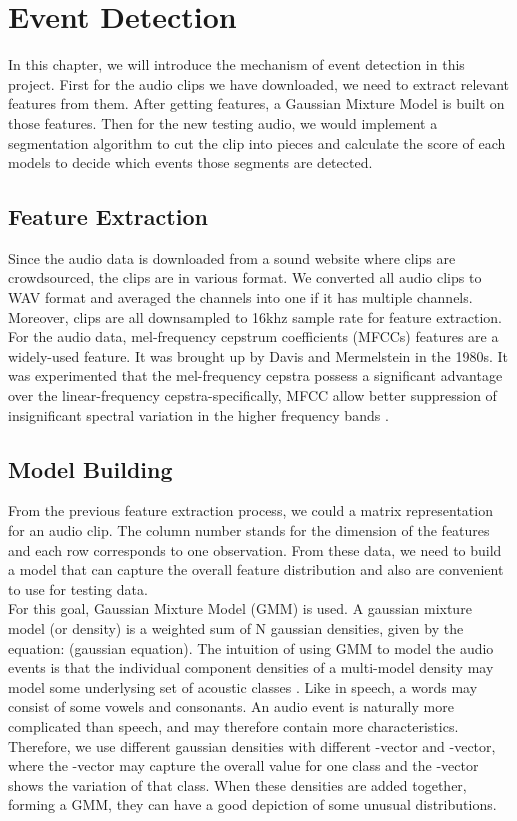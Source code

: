 \chapter{Event Detection}
In this chapter, we will introduce the mechanism of event detection in this project. First for the audio clips we have downloaded, we need to extract relevant features from them. After getting features, a Gaussian Mixture Model is built on those features. Then for the new testing audio, we would implement a segmentation algorithm to cut the clip into pieces and calculate the score of each models to decide which events those segments are detected.   
\section{Feature Extraction}
Since the audio data is downloaded from a sound website where clips are crowdsourced, the clips are in various format. We converted all audio clips to WAV format and averaged the channels into one if it has multiple channels. Moreover, clips are all downsampled to 16khz sample rate for feature extraction.\\ 
For the audio data, mel-frequency cepstrum coefficients (MFCCs) features are a widely-used feature. It was brought up by Davis and Mermelstein in the 1980s. 
It was experimented that the mel-frequency cepstra possess a significant advantage over the linear-frequency cepstra-specifically, MFCC allow better suppression of insignificant spectral variation in the higher frequency bands \parencite{davis1980comparison}.

\section{Model Building}
From the previous feature extraction process, we could a matrix representation for an audio clip. The column number stands for the dimension of the features and each row corresponds to one observation. From these data, we need to build a model that can capture the overall feature distribution and also are convenient to use for testing data.\\

For this goal, Gaussian Mixture Model (GMM) is used. A gaussian mixture model (or density) is a weighted sum of N gaussian densities, given by the equation: 
(gaussian equation). 
The intuition of using GMM to model the audio events is that the individual component densities of a multi-model density may model some underlysing set of acoustic classes \parencite{reynolds1995robust}. 
Like in speech, a words may consist of some vowels and consonants. 
An audio event is naturally more complicated than speech, and may therefore contain more characteristics. 
Therefore, we use different gaussian densities with different \mu-vector and \sigma-vector, where the \mu-vector may capture the overall value for one class and the \sigma-vector shows the variation of that class.  
When these densities are added together, forming a GMM, they can have a good depiction of some unusual distributions. \\ 


